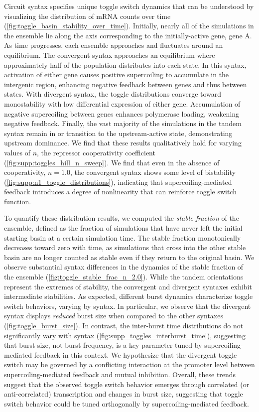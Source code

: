 \documentclass[11pt]{article} %
\begin{document}
Circuit syntax specifies unique toggle switch dynamics that can be understood by visualizing the distribution of mRNA counts over time (\cref{fig:toggle_basin_stability_over_time}). Initially, nearly all of the simulations in the ensemble lie along the axis corresponding to the initially-active gene, gene A. As time progresses, each ensemble approaches and fluctuates around an equilibrium.
The convergent syntax approaches an equilibrium where approximately half of the population distributes into each state. In this syntax, activation of either gene causes positive supercoiling to accumulate in the intergenic region, enhancing negative feedback between genes and thus between states. With divergent syntax, the toggle distributions converge toward monostability with low differential expression of either gene. Accumulation of negative supercoiling between genes enhances polymerase loading, weakening negative feedback. Finally, the vast majority of the simulations in the tandem syntax remain in or transition to the upstream-active state, demonstrating upstream dominance. We find that these results qualitatively hold for varying values of \(n\), the repressor cooperativity coefficient (\cref{fig:supp:toggles_hill_n_sweep}). We find that  even in the absence of cooperativity, \(n = 1.0\), the convergent syntax shows some level of bistability (\cref{fig:supp:n1_toggle_distributions}), indicating that supercoiling-mediated feedback introduces a degree of nonlinearity that can reinforce toggle switch function. 

To quantify these distribution results, we computed the \emph{stable fraction} of the ensemble, defined as the fraction of simulations that have never left the initial starting basin at a certain simulation time.
The stable fraction monotonically decreases toward zero with time, as simulations that cross into the other stable basin are no longer counted as stable even if they return to the original basin.
We observe substantial syntax differences in the dynamics of the stable fraction of the ensemble (\cref{fig:toggle_stable_frac_n_2.0}). While the tandem orientations represent the extremes of stability, the convergent and divergent syntaxes exhibit intermediate stabilities.
As expected, different burst dynamics characterize toggle switch behaviors, varying by syntax. In particular, we observe that the divergent syntax displays \emph{reduced} burst size when compared to the other syntaxes (\cref{fig:toggle_burst_size}). In contrast, the inter-burst time distributions do not significantly vary with syntax (\cref{fig:supp_toggles_interburst_time}), suggesting that burst size, not burst frequency, is a key parameter tuned by supercoiling-mediated feedback in this context. We hypothesize that the divergent toggle switch may be governed by a conflicting interaction at the promoter level between supercoiling-mediated feedback and mutual inhibition.
Overall, these trends suggest that the observed toggle switch behavior emerges through correlated (or anti-correlated) transcription and changes in burst size, suggesting that toggle switch behavior could be tuned orthogonally by supercoiling-mediated feedback.
\end{document}
